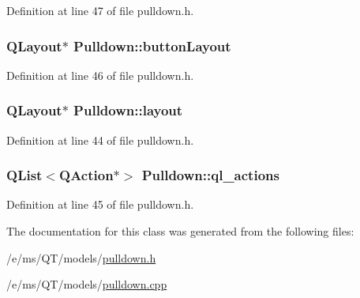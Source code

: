 Definition at line 47 of file pulldown.h.

\hypertarget{classPulldown_aefeadc3a4f7a06bef46341a396207622}{
\subsubsection[{buttonLayout}]{\setlength{\rightskip}{0pt plus 5cm}QLayout$\ast$ {\bf Pulldown::buttonLayout}}}
\label{classPulldown_aefeadc3a4f7a06bef46341a396207622}


Definition at line 46 of file pulldown.h.

\hypertarget{classPulldown_a9f543b38d4c7672c6625ddc5bbe8406b}{
\subsubsection[{layout}]{\setlength{\rightskip}{0pt plus 5cm}QLayout$\ast$ {\bf Pulldown::layout}}}
\label{classPulldown_a9f543b38d4c7672c6625ddc5bbe8406b}


Definition at line 44 of file pulldown.h.

\hypertarget{classPulldown_aa9f1b8ca4cc943e49fab19b9b4ee50f6}{
\subsubsection[{ql\_\-actions}]{\setlength{\rightskip}{0pt plus 5cm}QList$<$QAction$\ast$$>$ {\bf Pulldown::ql\_\-actions}}}
\label{classPulldown_aa9f1b8ca4cc943e49fab19b9b4ee50f6}


Definition at line 45 of file pulldown.h.



The documentation for this class was generated from the following files:\begin{DoxyCompactItemize}
\item 
/e/ms/QT/models/\hyperlink{pulldown_8h}{pulldown.h}\item 
/e/ms/QT/models/\hyperlink{pulldown_8cpp}{pulldown.cpp}\end{DoxyCompactItemize}
